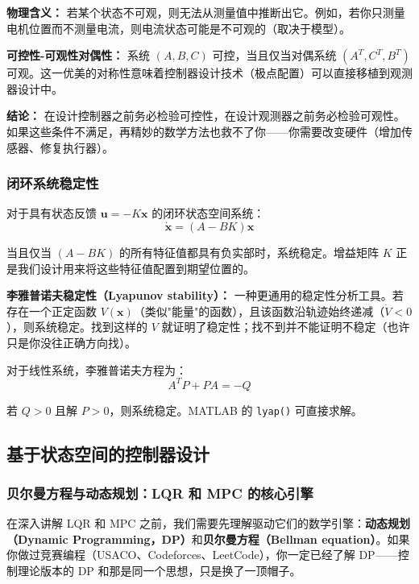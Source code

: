 \textbf{物理含义：} 若某个状态不可观，则无法从测量值中推断出它。例如，若你只测量电机位置而不测量电流，则电流状态可能是不可观的（取决于模型）。

\textbf{可控性-可观性对偶性：} 系统 $(A, B, C)$ 可控，当且仅当对偶系统 $(A^T, C^T, B^T)$ 可观。这一优美的对称性意味着控制器设计技术（极点配置）可以直接移植到观测器设计中。

\textbf{结论：} 在设计控制器之前务必检验可控性，在设计观测器之前务必检验可观性。如果这些条件不满足，再精妙的数学方法也救不了你——你需要改变硬件（增加传感器、修复执行器）。

\subsubsection{闭环系统稳定性}

对于具有状态反馈 $\mathbf{u} = -K\mathbf{x}$ 的闭环状态空间系统：
\begin{equation}
\dot{\mathbf{x}} = (A - BK)\mathbf{x}
\end{equation}

当且仅当 $(A - BK)$ 的所有特征值都具有负实部时，系统稳定。增益矩阵 $K$ 正是我们设计用来将这些特征值配置到期望位置的。

\textbf{李雅普诺夫稳定性（Lyapunov stability）：} 一种更通用的稳定性分析工具。若存在一个正定函数 $V(\mathbf{x})$（类似"能量"的函数），且该函数沿轨迹始终递减（$\dot{V} < 0$），则系统稳定。找到这样的 $V$ 就证明了稳定性；找不到并不能证明不稳定（也许只是你没往正确方向找）。

对于线性系统，李雅普诺夫方程为：
\begin{equation}
A^T P + PA = -Q
\end{equation}

若 $Q > 0$ 且解 $P > 0$，则系统稳定。MATLAB 的 \texttt{lyap()} 可直接求解。

\subsection{基于状态空间的控制器设计}

\subsubsection{贝尔曼方程与动态规划：LQR 和 MPC 的核心引擎}

在深入讲解 LQR 和 MPC 之前，我们需要先理解驱动它们的数学引擎：\textbf{动态规划（Dynamic Programming，DP）}和\textbf{贝尔曼方程（Bellman equation）}。如果你做过竞赛编程（USACO、Codeforces、LeetCode），你一定已经了解 DP——控制理论版本的 DP 和那是同一个思想，只是换了一顶帽子。

